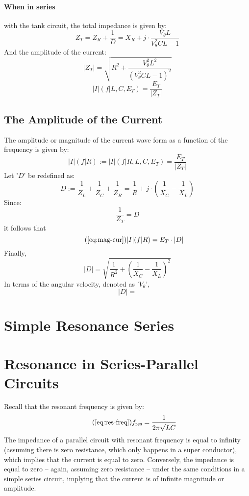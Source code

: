 \documentclass{article}
\begin{document}
	\paragraph[In Series]{When in series} with the tank circuit, the total 
	impedance is given by:
	$$ Z_T = Z_R + \frac{1}{D} = X_R  + j \cdot  \frac{V_\theta L}{V_\theta^2 
	CL -1}$$
	And the amplitude of the current:
	$$ |Z_T| = \sqrt{R^2 + \frac{V_\theta^2L^2}{(V_\theta^2CL - 1)^2}}$$
	$$  |I|(f \vert L, C, E_T) = \frac{E_T}{|Z_T|} $$
	\subsection[MagCur]{The Amplitude of the Current}
	The amplitude or magnitude of the current wave form as a function of the 
	frequency is 
	given by:
	\begin{equation}\label{eq:mag-cur}
		|I|(f \vert R) := |I|(f \vert R, L, C, E_T) = \frac{E_T}{|Z_T|}
	\end{equation}
	Let '$D$' be redefined as:
	$$ D:= \frac{1}{Z_L} + \frac{1}{Z_C} + \frac{1}{Z_R} = \frac{1}{R} + j 
	\cdot \left( \frac{1}{X_C} - \frac{1}{X_L}\right)$$
	Since:
	$$ \frac{1}{Z_T} = D$$
	it follows that
	\begin{equation}\tag{\ref{eq:mag-cur}}
		|I|(f \vert R) = E_T \cdot |D|
	\end{equation}
	Finally,
	$$ |D| = \sqrt{\frac{1}{R^2} + \left(\frac{1}{X_C} - 
	\frac{1}{X_L}\right)^2}$$
	In terms of the angular velocity, denoted as '$V_\theta$',
	$$ |D| = $$
	\section[Series]{Simple Resonance Series}
	
	\section[Series-Parallel]{Resonance in Series-Parallel Circuits}
	Recall that the resonant frequency is given by:
	\begin{equation}\tag{\ref{eq:res-freq}}
		f_{\text{res}}=\frac{1}{2\pi \sqrt{LC}}
	\end{equation}
	The impedance of a parallel circuit with resonant frequency is equal to 
	infinity (assuming there is zero resistance, which only happens in a super 
	conductor), which implies that the current is equal to zero.  Conversely, 
	the impedance is equal to zero -- again, assuming zero resistance -- under 
	the same conditions in a simple series circuit, implying that the current 
	is of infinite magnitude or 
	amplitude.
\end{document}
